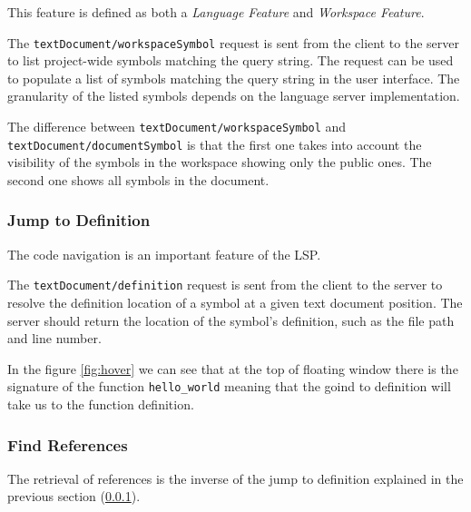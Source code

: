 \noindent
This feature is defined as both a \textit{Language Feature} and \textit{Workspace Feature}.

The \texttt{textDocument/workspaceSymbol} request is sent from the client to the server to list project-wide symbols matching the query string. The request can be used to populate a list of symbols matching the query string in the user interface. The granularity of the listed symbols depends on the language server implementation.

The difference between \texttt{textDocument/workspaceSymbol} and \texttt{textDocument/documentSymbol} is that the first one takes into account the visibility of the symbols in the workspace showing only the public ones. The second one shows all symbols in the document.


\subsubsection{Jump to Definition}\label{subsubsec:JumpToDefinition}
\hfill \break

The code navigation is an important feature of the LSP.

The \texttt{textDocument/definition} request is sent from the client to the server to resolve the definition location of a symbol at a given text document position. The server should return the location of the symbol's definition, such as the file path and line number.

In the figure \ref{fig:hover} we can see that at the top of floating window there is the signature of the function \texttt{hello\_world} meaning that the goind to definition will take us to the function definition.

\subsubsection{Find References}
\hfill \break

The retrieval of references is the inverse of the jump to definition explained in the previous section (\ref{subsubsec:JumpToDefinition}).

